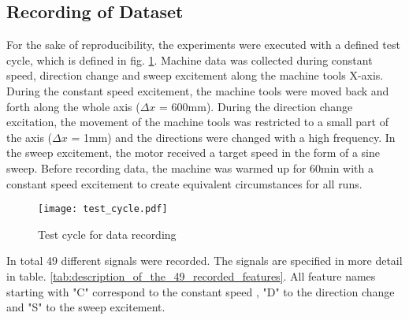 \subsection{Recording of Dataset}
For the sake of reproducibility, the experiments were executed with a defined test cycle, which is defined in fig. \ref{fig:test_cycle}. Machine data was collected during constant speed, direction change and sweep excitement along the machine tools X-axis. During the constant speed excitement, the machine tools were moved back and forth along the whole axis ($\Delta x$ = 600mm). During the direction change excitation, the movement of the machine tools was restricted to a small part of the axis ($\Delta x$ = 1mm) and the directions were changed with a high frequency. In the sweep excitement, the motor received a target speed in the form of a sine sweep. Before recording data, the machine was warmed up for 60min with a constant speed excitement to create equivalent circumstances for all runs.

\begin{figure}[H]
  \centering
  \texttt{[image: test\_cycle.pdf]}
  \caption {Test cycle for data recording}
  \label{fig:test_cycle}
\end{figure}

In total 49 different signals were recorded. The signals are specified in more detail in table. \ref{tab:description_of_the_49_recorded_features}. All feature names starting with "C" correspond to the constant speed , "D" to the direction change and "S" to the sweep excitement.

